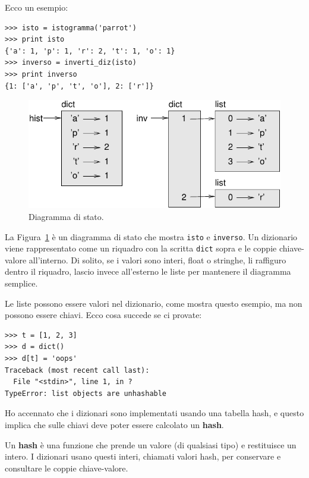\documentclass[10pt]{book}
\begin{document}
Ecco un esempio:

\begin{verbatim}
>>> isto = istogramma('parrot')
>>> print isto
{'a': 1, 'p': 1, 'r': 2, 't': 1, 'o': 1}
>>> inverso = inverti_diz(isto)
>>> print inverso
{1: ['a', 'p', 't', 'o'], 2: ['r']}
\end{verbatim}

\begin{figure}
\centerline
{\includegraphics[scale=0.8]{figs/dict1.pdf}}
\caption{Diagramma di stato.}
\label{fig.dict1}
\end{figure}

La Figura~\ref{fig.dict1} è un diagramma di stato che mostra {\tt isto} e {\tt inverso}.
Un dizionario viene rappresentato come un riquadro con la scritta {\tt dict} sopra e le coppie chiave-valore all'interno. Di solito, se i valori sono interi, float o stringhe, li raffiguro dentro il riquadro, lascio invece all'esterno le liste per mantenere il diagramma semplice.

Le liste possono essere valori nel dizionario, come mostra questo esempio, ma non possono essere chiavi. Ecco cosa succede se ci provate:


\begin{verbatim}
>>> t = [1, 2, 3]
>>> d = dict()
>>> d[t] = 'oops'
Traceback (most recent call last):
  File "<stdin>", line 1, in ?
TypeError: list objects are unhashable
\end{verbatim}
%
Ho accennato che i dizionari sono implementati usando una tabella hash, e questo implica che sulle chiavi deve poter essere calcolato un {\bf hash}.

Un {\bf hash} è una funzione che prende un valore (di qualsiasi tipo) e restituisce un intero. I dizionari usano questi interi, chiamati valori hash, per conservare e consultare le coppie chiave-valore.
\end{document}
